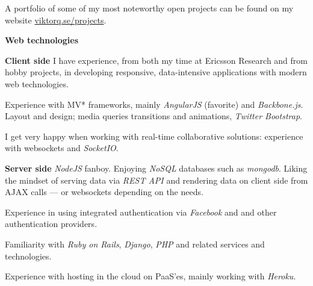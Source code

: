 \label{programming}

  A portfolio of some of my most noteworthy open projects can be found on my
  website \href{http://viktorq.se/projects}{viktorq.se/projects}.

\newenvironment{myitemize}{%
  \let\olditem\item
  \renewcommand\item[1][]{\olditem \textbf{##1}\hspace{0.35em}}
  \begin{list}{}{%
    \setlength{\leftmargin}{1.5em}
    \setlength{\itemsep}{0.25em}
    \setlength{\parskip}{0em}
    \setlength{\parsep}{0.25em}
  }
}{%
  \end{list}
}

\begin{myitemize}

  \item[Web technologies]
    \begin{list}{}{%
      \setlength{\leftmargin}{1.5em}
      \setlength{\itemsep}{0em}
      \setlength{\parskip}{0em}
      \setlength{\parsep}{0.25em}
    }
      \item[Client side]
        I have experience, from both my time at Ericsson Research and from hobby projects,
        in developing responsive, data-intensive applications
        with modern web technologies.

        Experience with MV* frameworks, mainly
        \emph{AngularJS} (favorite) and \emph{Backbone.js}. Layout and design; media queries
        transitions and animations, \emph{Twitter Bootstrap}.

        I get very happy when working
        with real-time collaborative solutions: experience with websockets and \emph{SocketIO}.
      \item[Server side]
        \emph{NodeJS} fanboy. Enjoying \emph{NoSQL} databases such as \emph{mongodb}.
        Liking the mindset of serving data via \emph{REST API} and rendering data on client side
        from AJAX calls --- or websockets depending on the needs.

        Experience in using integrated authentication via \emph{Facebook} and and other authentication
        providers.

        Familiarity with \emph{Ruby on Rails}, \emph{Django}, \emph{PHP} and related services
        and technologies.

        Experience with hosting in the cloud on PaaS'es, mainly working with \emph{Heroku}.
    \end{list}


\end{myitemize}
